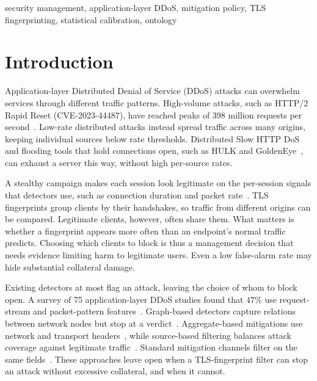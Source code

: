 \documentclass[conference,letterpaper,10pt]{IEEEtran}
\newcommand\1{\textit{(i)}}
\newcommand\2{\textit{(ii)}}
\newcommand\3{\textit{(iii)}}
\newcommand\4{\textit{(iv)}}
\newcommand\5{\textit{(v)}}
\newcommand\6{\textit{(vi)}}
\newcommand\7{\textit{(vii)}}
\newcommand\8{\textit{(viii)}}
\newcommand\9{\textit{(ix)}}
\begin{document}
\begin{IEEEkeywords}
security management, application-layer DDoS, mitigation policy, TLS
fingerprinting, statistical calibration, ontology
\end{IEEEkeywords}

\section{Introduction}
\label{sec:intro}

Application-layer Distributed Denial of Service (DDoS)
attacks can overwhelm services through different traffic
patterns. High-volume attacks, such as HTTP/2 Rapid Reset
(CVE-2023-44487), have reached peaks of 398 million
requests per second~\cite{google2023rapidreset}. Low-rate
distributed attacks instead spread traffic across many
origins, keeping individual sources below rate thresholds.
Distributed Slow HTTP DoS~\cite{cambiaso2013slowdos} and
flooding tools that hold connections open, such as HULK and
GoldenEye~\cite{sharafaldin2018cicids}, can exhaust a server
this way, without high per-source rates.

A stealthy campaign makes each session look legitimate on
the per-session signals that detectors use, such as
connection duration and packet rate~\cite{kemp2023approach}.
TLS fingerprints group clients by their handshakes, so
traffic from different origins can be compared.
Legitimate clients, however, often share them.
What matters is whether a fingerprint appears more often
than an endpoint's normal traffic predicts. Choosing which
clients to block is thus a management decision that needs
evidence limiting harm to legitimate users. Even a low
false-alarm
rate may hide substantial collateral damage.

Existing detectors at most flag an attack, leaving the
choice of whom to block open.
A survey of 75 application-layer DDoS studies found that
$47\%$ use request-stream and packet-pattern
features~\cite{odusami2020survey}. Graph-based detectors
capture relations between network nodes but stop at a
verdict~\cite{belcastro2025klage}. Aggregate-based
mitigations use network and transport
headers~\cite{mahajan2002pushback,alcoz2022accturbo}, while
source-based filtering balances attack coverage against
legitimate traffic~\cite{soldo2012filtering}. Standard
mitigation channels filter on the same
fields~\cite{dots2020data,rfc8955flowspec}. These approaches
leave open when a TLS-fingerprint filter can stop an attack
without excessive collateral, and when it cannot.
\end{document}
